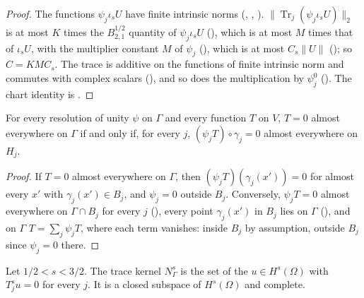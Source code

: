 \begin{proof}
\leanok
The functions $\psi_j \iota_s U$ have finite intrinsic norms (,
, ).
$\|\operatorname{Tr}_j(\psi_j \iota_s U)\|_2$ is at most $K$ times the $B^{1/2}_{2,1}$ quantity
of $\psi_j \iota_s U$ (), which is at most $M$ times that of
$\iota_s U$, with the multiplier constant $M$ of $\psi_j$ (), which is at
most $C_s \|U\|$ (); so $C = K M C_s$. The trace
is additive on the functions of finite intrinsic norm and commutes with complex scalars
(), and so does the multiplication by $\psi^0_j$
(). The chart identity is .
\end{proof}

\begin{lemma}
\label{lem:boundary-vanishing-charts}
\leanok
{}
For every resolution of unity $\psi$ on $\Gamma$ and every function $T$ on $V$, $T = 0$ almost
everywhere on $\Gamma$ if and only if, for every $j$, $(\psi_j T) \circ \gamma_j = 0$ almost
everywhere on $H_j$.
\end{lemma}

\begin{proof}
\leanok
If $T = 0$ almost everywhere on $\Gamma$, then $(\psi_j T)(\gamma_j(x')) = 0$ for almost every
$x'$ with $\gamma_j(x') \in B_j$, and $\psi_j = 0$ outside $B_j$. Conversely, $\psi_j T = 0$ almost
everywhere on $\Gamma \cap B_j$ for every $j$ (), every point
$\gamma_j(x')$ in $B_j$ lies on $\Gamma$ (), and on $\Gamma$
$T = \sum_j \psi_j T$, where each term vanishes: inside $B_j$ by assumption, outside $B_j$ since
$\psi_j = 0$ there.
\end{proof}

\begin{definition}
\label{def:trace-kernel}
\leanok
{}
Let $1/2 < s < 3/2$. The trace kernel $N^s_\Gamma$ is the set of the $u \in H^s(\Omega)$ with
$T^s_j u = 0$ for every $j$. It is a closed subspace of $H^s(\Omega)$ and complete.
\end{definition}

